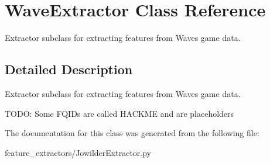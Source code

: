 \hypertarget{class_wave_extractor}{}\section{Wave\+Extractor Class Reference}
\label{class_wave_extractor}


Extractor subclass for extracting features from Waves game data.  




\subsection{Detailed Description}
Extractor subclass for extracting features from Waves game data. 

T\+O\+DO\+: Some F\+Q\+I\+Ds are called H\+A\+C\+K\+ME and are placeholders 

The documentation for this class was generated from the following file\+:\begin{DoxyCompactItemize}
\item 
feature\+\_\+extractors/Jowilder\+Extractor.\+py\end{DoxyCompactItemize}
